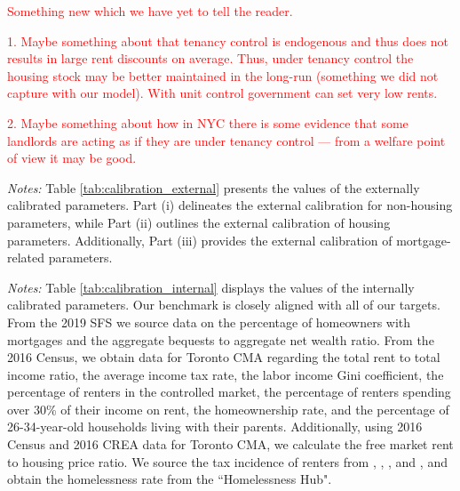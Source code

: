 \documentclass[parskip=full]{article}
\newenvironment{fignote2}[1]
{
\par
\medskip
\begin{minipage}{#1}
\footnotesize
}
{
\end{minipage}
}
\begin{document}
\textcolor{red}{Something new which we have yet to tell the reader.}

\textcolor{red}{1. Maybe something about that tenancy control is endogenous and thus does not results in large rent discounts on average. Thus, under tenancy control the housing stock may be better maintained in the long-run (something we did not capture with our model). With unit control government can set very low rents.}

\textcolor{red}{2. Maybe something about how in NYC there is some evidence that some landlords are acting as if they are under tenancy control --- from a welfare point of view it may be good.}





\vspace{1cm}
    
\begin{table}[H]
    \centering
    \caption{Externally assigned parameter values}
    \vspace{-1.25cm}
    \label{tab:calibration_external}
    
    \vspace{-0.5cm}
    \begin{fignote2}{1.11\textwidth}
    \textit{Notes:} Table \ref{tab:calibration_external} presents the values of the externally calibrated parameters. Part (i) delineates the external calibration for non-housing parameters, while Part (ii) outlines the external calibration of housing parameters. Additionally, Part (iii) provides the external calibration of mortgage-related parameters.
    \end{fignote2}
\end{table}

\begin{table}[H]
    \centering
    \caption{Internally assigned parameter values}
    \vspace{-1.25cm}
    \label{tab:calibration_internal}
    
    \vspace{-0.5cm}
    \begin{fignote2}{1.08\textwidth}
    \textit{Notes:} Table \ref{tab:calibration_internal} displays the values of the internally calibrated parameters. Our benchmark is closely aligned with all of our targets. From the 2019 SFS we source data on the percentage of homeowners with mortgages and the aggregate bequests to aggregate net wealth ratio. From the 2016 Census, we obtain data for Toronto CMA regarding the total rent to total income ratio, the average income tax rate, the labor income Gini coefficient, the percentage of renters in the controlled market, the percentage of renters spending over 30\% of their income on rent, the homeownership rate, and the percentage of 26-34-year-old households living with their parents. Additionally, using 2016 Census and 2016 CREA data for Toronto CMA, we calculate the free market rent to housing price ratio. We source the tax incidence of renters from \citet{cy-1994}, \citet{susin-2002}, \citet{fack-2006}, and \citet{sy-2020}, and obtain the homelessness rate from the ``Homelessness Hub".
    \end{fignote2}
\end{table}
\end{document}
